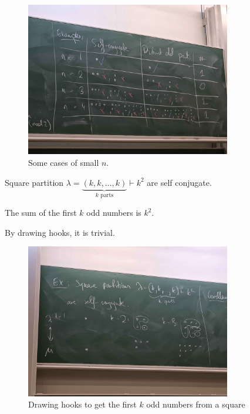 \begin{figure}[H]
    \centering
    \includegraphics[width=0.8\textwidth]{./Figures/20250923_155744.jpg}
    \caption{Some cases of small \(n\).}
    \label{fig:self conjugate distinct odd part}
\end{figure}

\begin{eg}
    Square partition \(\lambda = \underbrace{(k, k, \dots ,k)}_{k \text{ parts}} \vdash k^2\) are self conjugate. 
\end{eg}

\begin{corollary}
    The sum of the first \(k\) odd numbers is \(k^2\).  
\end{corollary}
\begin{explanation}
    By drawing hooks, it is trivial.
    \begin{figure}[H]
        \centering
        \includegraphics[width=0.8\textwidth]{Figures/20250923_161638.jpg}
        \caption{Drawing hooks to get the first \(k\) odd numbers from a square}
        \label{fig:first k odd sum is kk}
    \end{figure}
\end{explanation}
